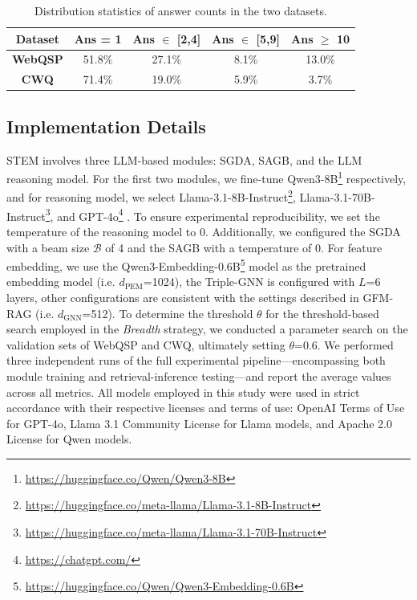 \documentclass[11pt]{article}
\begin{document}
\begin{table}[t]
\centering
\renewcommand{\arraystretch}{1.15} %
\setlength{\tabcolsep}{5pt} 

\begin{tabular}{c|cccc}
\hline
{\textbf{Dataset}} & {\textbf{Ans} = 1} & {\textbf{Ans} $\in$ [2,4]} & {\textbf{Ans} $\in$ [5,9]} & {\textbf{Ans} $\geq$ 10} \\

\hline
\textbf{WebQSP}    &  51.8\% & 27.1\% & 8.1\% & 13.0\% \\
\textbf{CWQ}  & 71.4\% & 19.0\% & 5.9\% & 3.7\% \\
\hline
\end{tabular}
\caption{Distribution statistics of answer counts in the two datasets.}
\label{tab:ans_stat}
\end{table}

\subsection{Implementation Details}
STEM involves three LLM-based modules: SGDA, SAGB, and the LLM reasoning model. For the first two modules, we fine-tune Qwen3-8B\footnote{\url{https://huggingface.co/Qwen/Qwen3-8B}} respectively, and for reasoning model, we select Llama-3.1-8B-Instruct\footnote{\url{https://huggingface.co/meta-llama/Llama-3.1-8B-Instruct}}, Llama-3.1-70B-Instruct\footnote{\url{https://huggingface.co/meta-llama/Llama-3.1-70B-Instruct}}, and GPT-4o\footnote{\url{https://chatgpt.com/}} \cite{openai2024gpt4osystemcard}. To ensure experimental reproducibility, we set the temperature of the reasoning model to 0. Additionally, we configured the SGDA with a beam size \( \mathcal{B} \) of 4 and the SAGB with a temperature of 0. For feature embedding, we use the Qwen3-Embedding-0.6B\footnote{\url{https://huggingface.co/Qwen/Qwen3-Embedding-0.6B}} \cite{zhang2025qwen3embedding} model as the pretrained embedding model (i.e. $d_\text{PEM}$=1024), the Triple-GNN is configured with $L$=6 layers, other configurations are consistent with the settings described in GFM-RAG \cite{luo2025gfmrag_arxiv}(i.e. $d_\text{GNN}$=512). To determine the threshold $\theta$ for the threshold-based search employed in the \textit{Breadth} strategy, we conducted a parameter search on the validation sets of WebQSP and CWQ, ultimately setting $\theta
$=0.6. We performed three independent runs of the full experimental pipeline—encompassing both module training and retrieval-inference testing—and report the average values across all metrics. All models employed in this study were used in strict accordance with their respective licenses and terms of use: OpenAI Terms of Use for GPT-4o, Llama 3.1 Community License for Llama models, and Apache 2.0 License for Qwen models.
\end{document}
